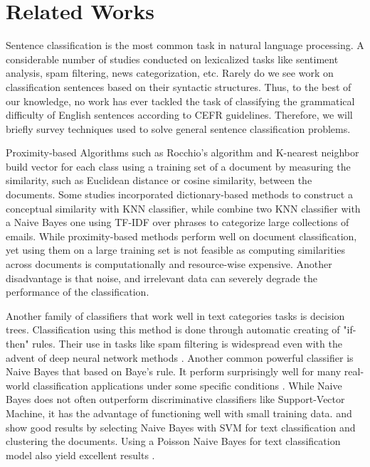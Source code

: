 \section{Related Works}
\label{sec:research_background}

Sentence classification is the most common task in natural language processing. A considerable number of studies conducted on lexicalized tasks like sentiment analysis, spam filtering, news categorization, etc. Rarely do we see work on classification sentences based on their syntactic structures. Thus, to the best of our knowledge, no work has ever tackled the task of classifying the grammatical difficulty of English sentences according to CEFR guidelines. Therefore, we will briefly survey techniques used to solve general sentence classification problems. 

Proximity-based Algorithms such as Rocchio's algorithm \citep{rocchio1971relevance}  and K-nearest neighbor \citep{tam_comparative_2002} build vector for each class using a training set of a document by measuring the similarity, such as Euclidean distance or cosine similarity, between the documents. Some studies \citep{bang_hierarchical_2006} incorporated dictionary-based methods to construct a conceptual similarity with KNN classifier, while \citep{chang_using_2009} combine two KNN classifier with a Naive Bayes one using TF-IDF over phrases to categorize large collections of emails. While proximity-based methods perform well on document classification, yet using them on a large training set is not feasible as computing similarities across documents is computationally and resource-wise expensive. Another disadvantage is that noise, and irrelevant data can severely degrade the performance of the classification.

Another family of classifiers that work well in text categories tasks is decision trees. Classification using this method is done through automatic creating of "if-then" rules. Their use in tasks like spam filtering is widespread even with the advent of deep neural network methods \citep{wu_behavior-based_2009}. Another common powerful classifier is Naive Bayes that based on Baye's rule. It perform surprisingly well for many real-world classification applications under some specific conditions \citep{mccallum_comparison_nodate} \citep{rish_analysis_2001}. While Naive Bayes does not often outperform discriminative classifiers like Support-Vector Machine, it has the advantage of functioning well with small training data. \citep{kim_effective_2006} and \citep{isa_text_2008} show good results by selecting Naive Bayes with SVM for text classification and clustering the documents. Using a Poisson Naive Bayes for text classification model also yield excellent results \citep{isa_text_2008}.  
 
